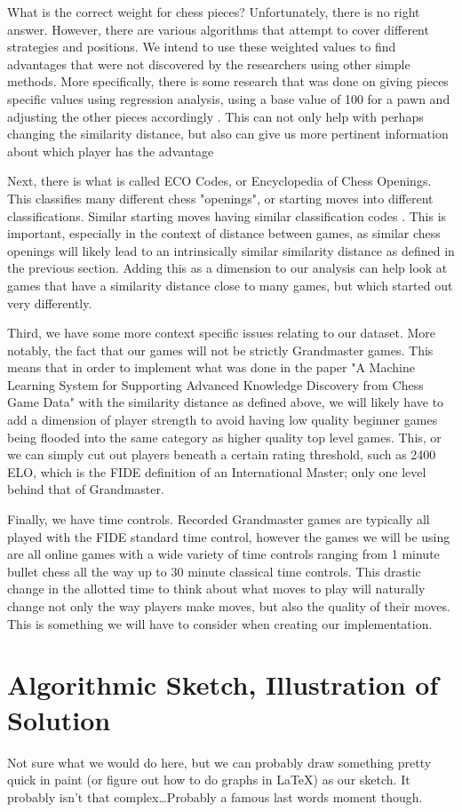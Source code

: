 \documentclass[12pt]{article}
\begin{document}
    What is the correct weight for chess pieces? Unfortunately, there is no right answer. However, there are various algorithms that attempt to cover different strategies and positions. We intend to use these weighted values to find advantages that were not discovered by the researchers using other simple methods. More specifically, there is some research that was done on giving pieces specific values using regression analysis, using a base value of 100 for a pawn and adjusting the other pieces accordingly \cite{piece_values}. This can not only help with perhaps changing the similarity distance, but also can give us more pertinent information about which player has the advantage

    Next, there is what is called ECO Codes, or Encyclopedia of Chess Openings. This classifies many different chess "openings", or starting moves into different classifications. Similar starting moves having similar classification codes \cite{eco}. This is important, especially in the context of distance between games, as similar chess openings will likely lead to an intrinsically similar similarity distance as defined in the previous section. Adding this as a dimension to our analysis can help look at games that have a similarity distance close to many games, but which started out very differently. 

    Third, we have some more context specific issues relating to our dataset. More notably, the fact that our games will not be strictly Grandmaster games. This means that in order to implement what was done in the paper "A Machine Learning System for Supporting Advanced Knowledge Discovery from Chess Game Data" with the similarity distance as defined above, we will likely have to add a dimension of player strength to avoid having low quality beginner games being flooded into the same category as higher quality top level games. This, or we can simply cut out players beneath a certain rating threshold, such as 2400 ELO, which is the FIDE definition of an International Master; only one level behind that of Grandmaster.

    Finally, we have time controls. Recorded Grandmaster games are typically all played with the FIDE standard time control, however the games we will be using are all online games with a wide variety of time controls ranging from 1 minute bullet chess all the way up to 30 minute classical time controls. This drastic change in the allotted time to think about what moves to play will naturally change not only the way players make moves, but also the quality of their moves. This is something we will have to consider when creating our implementation.


    \section{Algorithmic Sketch, Illustration of Solution}

    Not sure what we would do here, but we can probably draw something pretty quick in paint (or figure out how to do graphs in \LaTeX) as our sketch. It probably isn't that complex\dots Probably a famous last words moment though.

    \newpage
    \printbibliography
\end{document}
